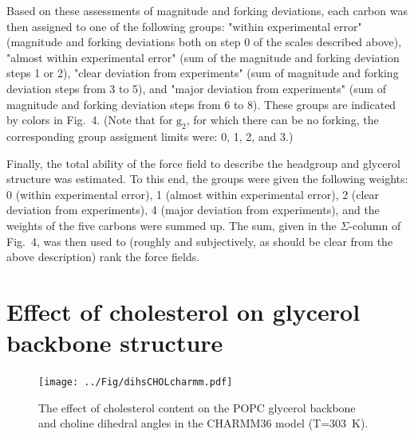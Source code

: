 \documentclass[journal=jacsat,manuscript=article]{achemso}
\begin{document}
Based on these assessments of magnitude and forking deviations,
each carbon was then assigned to one of the following groups:
"within experimental error"
(magnitude and forking deviations both on step 0 of the scales described above),
"almost within experimental error"
(sum of the magnitude and forking deviation steps 1 or 2),
"clear deviation from experiments"
(sum of magnitude and forking deviation steps from 3 to 5), and
"major deviation from experiments"
(sum of magnitude and forking deviation steps from 6 to 8).
These groups are indicated by colors in Fig.~4.
(Note that for $\mathrm{g_2}$, for which there can be no forking,
the corresponding group assigment limits were: 0, 1, 2, and 3.)

Finally, the total ability of the force field to describe the headgroup and
glycerol structure was estimated.
To this end, the groups were given the following weights:
0 (within experimental error),
1 (almost within experimental error),
2 (clear deviation from experiments),
4 (major deviation from experiments),
and the weights of the five carbons were summed up.
The sum, given in the $\Sigma$-column of Fig.~4,
was then used to (roughly and subjectively, as should be clear from the
above description) rank the force fields.

\newpage

\section{Effect of cholesterol on glycerol backbone structure}
\begin{figure}[]
  \centering
  \texttt{[image: ../Fig/dihsCHOLcharmm.pdf]}
  \caption{\label{dihsCHOLcharmm}
    The effect of cholesterol content on the POPC glycerol backbone and choline dihedral angles in the CHARMM36 model (T=303~K).}
\end{figure}
\end{document}
